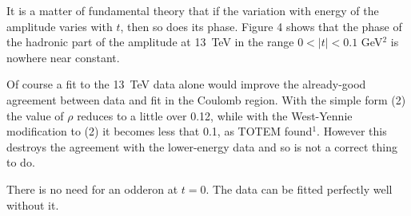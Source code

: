 It is a matter of fundamental theory that if the variation with energy
of the amplitude varies with $t$, then so does its phase. Figure 4 shows that
the phase of the hadronic part of the amplitude at 13~TeV in the range
$0<|t|<0.1$ GeV$^2$ is nowhere near constant.

Of course a fit to the 13~TeV data alone would improve the already-good 
agreement between data and fit in the Coulomb region. With the simple
form (2) the value of $\rho$ reduces to a little over 0.12, while with the
West-Yennie modification to (2) it becomes less that 0.1, as TOTEM
found$^1$. However this destroys the agreement with the lower-energy
data and so is not a correct thing to do.

There is no need for an odderon at $t=0$. The data can be fitted perfectly
well without it.
\bigskip
\listrefs
\bye
